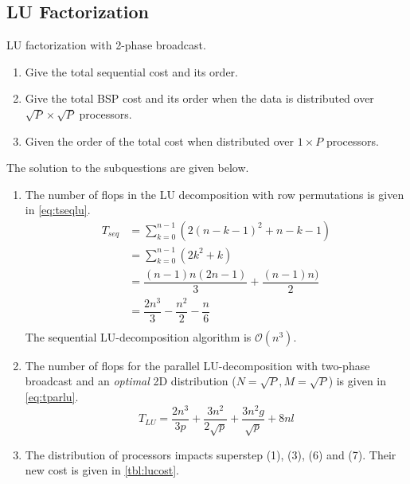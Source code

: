\documentclass[../main.tex]{subfiles}
\begin{document}
\subsection{LU Factorization}
\begin{question}
LU factorization with 2-phase broadcast.
\begin{enumerate}
	\item Give the total sequential cost and its order.
	\item Give the total BSP cost and its order when the data is distributed over $\sqrt{P} \times \sqrt{P}$
	processors.
	\item Given the order of the total cost when distributed over $1 \times P$ processors.
\end{enumerate}
\end{question}
\begin{solution} The solution to the subquestions are given below.
\begin{enumerate}
	\item The number of flops in the LU decomposition with row permutations is given in \autoref{eq:tseqlu}.
	\begin{equation}\label{eq:tseqlu}
		\begin{array}{ll}
		T_{seq} & = \displaystyle\sum_{k=0}^{n-1} (2(n - k - 1)^2 + n - k -1) \\
				& = \displaystyle\sum_{k=0}^{n-1} (2k^2 + k) \\
				& = \dfrac{(n-1)n(2n-1)}{3} + \dfrac{(n-1)n)}{2} \\
				& = \dfrac{2n^3}{3} - \dfrac{n^2}{2} - \dfrac{n}{6} \\
		\end{array}
	\end{equation}
	The sequential LU-decomposition algorithm is $\mathcal{O}(n^3)$.
	\item The number of flops for the parallel LU-decomposition with two-phase broadcast and an \emph{optimal} 2D distribution ($N = \sqrt{P}, M = \sqrt{P}$) is given in \autoref{eq:tparlu}.
	\begin{equation}\label{eq:tparlu}
			T_{LU}  = \dfrac{2n^3}{3p} + \dfrac{3n^2}{2\sqrt{p}} + \dfrac{3n^2g}{\sqrt{p}} + 8nl
	\end{equation}
	\item The distribution of processors impacts superstep (1), (3), (6) and (7). Their new cost is given in \autoref{tbl:lucost}.
	\begin{table}[H]
	\centering
	\begin{tabular}{ll}

\end{tabular}
\end{table}
\end{enumerate}
\end{solution}
\end{document}
